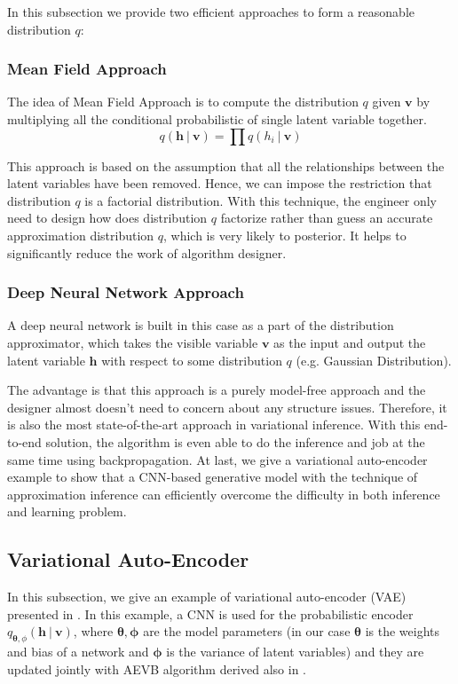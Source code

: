 \documentclass[conference]{IEEEtran}
\begin{document}
In this subsection we provide two efficient approaches to form a reasonable distribution $q$:
\subsubsection{Mean Field Approach}
The idea of Mean Field Approach is to compute the distribution $q$ given $\boldsymbol{v}$ by multiplying all the conditional probabilistic of single latent variable together.
\begin{equation}
	q(\boldsymbol{h}\ |\ \boldsymbol{v}) = \prod q(h_i\ |\ \boldsymbol{v})
\end{equation}

This approach is based on the assumption that all the relationships between the latent variables have been removed. Hence, we can impose the restriction that distribution $q$ is a factorial distribution. With this technique, the engineer only need to design how does distribution $q$ factorize rather than guess an accurate approximation distribution $q$, which is very likely to posterior. It helps to significantly reduce the work of algorithm designer.
\subsubsection{Deep Neural Network Approach}
A deep neural network is built in this case as a part of the distribution approximator, which takes the visible variable $\boldsymbol{v}$ as the input and output the latent variable $\boldsymbol{h}$ with respect to some distribution $q$ (e.g. Gaussian Distribution).

The advantage is that this approach is a purely model-free approach and the designer almost doesn't need to concern about any structure issues. Therefore, it is also the most state-of-the-art approach in variational inference. With this end-to-end solution, the algorithm is even able to do the inference and job at the same time using backpropagation. At last, we give a variational auto-encoder example to show that a CNN-based generative model with the technique of approximation inference can efficiently overcome the difficulty in both inference and learning problem.
\subsection{Variational Auto-Encoder}
In this subsection, we give an example of variational auto-encoder (VAE) presented in \cite{kingma2013auto}. In this example, a CNN is used for the probabilistic encoder $q_{\boldsymbol{\theta}, \phi}(\boldsymbol{h}\ |\ \boldsymbol{v})$, where $\boldsymbol{\theta}, \boldsymbol{\phi}$ are the model parameters (in our case $\boldsymbol{\theta}$ is the weights and bias of a network and $\boldsymbol{\phi}$ is the variance of latent variables) and they are updated jointly with AEVB algorithm derived also in \cite{kingma2013auto}.
\end{document}
